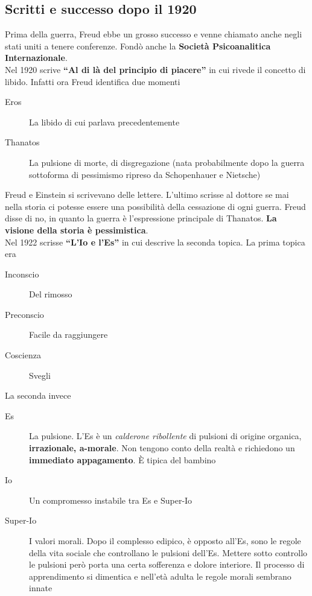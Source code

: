 \subsection{Scritti e successo dopo il 1920}
Prima della guerra, Freud ebbe un grosso successo e venne chiamato anche negli stati uniti a tenere
conferenze. Fondò anche la \textbf{Società Psicoanalitica Internazionale}.\\ [\baselineskip]
Nel 1920 scrive \textbf{``Al di là del principio di piacere''} in cui rivede il concetto di libido.
Infatti ora Freud identifica due momenti
\begin{description}
  \item[Eros] La libido di cui parlava precedentemente
  \item[Thanatos] La pulsione di morte, di disgregazione (nata probabilmente dopo la guerra 
    sottoforma di pessimismo ripreso da Schopenhauer e Nietsche)
\end{description}
Freud e Einstein si scrivevano delle lettere. L'ultimo scrisse al dottore se mai nella storia ci 
potesse essere una possibilità della cessazione di ogni guerra. Freud disse di no, in quanto la 
guerra è l'espressione principale di Thanatos. \textbf{La visione della storia è pessimistica}.\\
[\baselineskip]
Nel 1922 scrisse \textbf{``L'Io e l'Es''} in cui descrive la seconda topica. La prima topica era
\begin{description}
  \item[Inconscio] Del rimosso
  \item[Preconscio] Facile da raggiungere
  \item[Coscienza] Svegli
\end{description}
La seconda invece
\begin{description}
  \item[Es] La pulsione. L'Es è un \textit{calderone ribollente} di pulsioni di origine organica,
    \textbf{irrazionale, a-morale}. Non tengono conto della realtà e richiedono un \textbf{immediato
    appagamento}. È tipica del bambino
  \item[Io] Un compromesso instabile tra Es e Super-Io
  \item[Super-Io] I valori morali. Dopo il complesso edipico, è opposto all'Es, sono le regole della
    vita sociale che controllano le pulsioni dell'Es. Mettere sotto controllo le pulsioni però porta
    una certa sofferenza e dolore interiore. Il processo di apprendimento si dimentica e nell'età
    adulta le regole morali sembrano innate
\end{description}
